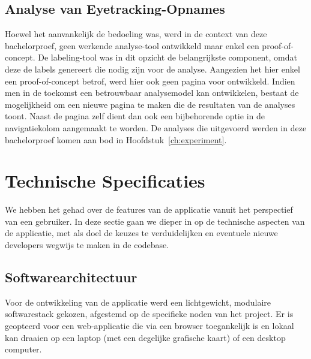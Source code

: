 \subsection{Analyse van Eyetracking-Opnames}

Hoewel het aanvankelijk de bedoeling was, werd in de context van deze bachelorproef, geen werkende analyse-tool ontwikkeld maar enkel een proof-of-concept.
De labeling-tool was in dit opzicht de belangrijkste component, omdat deze de labels genereert die nodig zijn voor de analyse.
Aangezien het hier enkel een proof-of-concept betrof, werd hier ook geen pagina voor ontwikkeld.
Indien men in de toekomst een betrouwbaar analysemodel kan ontwikkelen, bestaat de mogelijkheid om een nieuwe pagina te maken die de resultaten van de analyses toont.
Naast de pagina zelf dient dan ook een bijbehorende optie in de navigatiekolom aangemaakt te worden.
De analyses die uitgevoerd werden in deze bachelorproef komen aan bod in Hoofdstuk~\ref{ch:experiment}.

\section{Technische Specificaties}

We hebben het gehad over de features van de applicatie vanuit het perspectief van een gebruiker.
In deze sectie gaan we dieper in op de technische aspecten van de applicatie, 
met als doel de keuzes te verduidelijken en eventuele nieuwe developers wegwijs te maken in de codebase.

\subsection{Softwarearchitectuur}
\label{sec:software-architectuur}

Voor de ontwikkeling van de applicatie werd een lichtgewicht, modulaire softwarestack gekozen, afgestemd op de specifieke noden van het project.
Er is geopteerd voor een web-applicatie die via een browser toegankelijk is en lokaal kan draaien op een laptop (met een degelijke grafische kaart) of een desktop computer.

